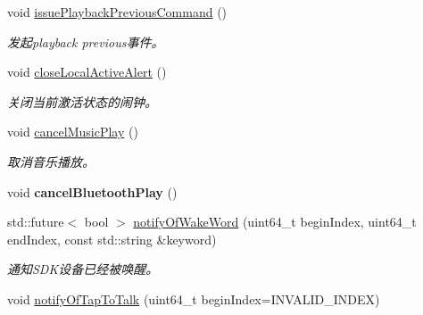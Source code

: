 \begin{DoxyCompactItemize}
\mbox{\label{classduerOSDcsSDK_1_1sdkInterfaces_1_1DcsSdk_ad9b5205e34f0671f00b5f50f197eec5a}} 
void \hyperlink{classduerOSDcsSDK_1_1sdkInterfaces_1_1DcsSdk_ad9b5205e34f0671f00b5f50f197eec5a}{issue\+Playback\+Previous\+Command} ()
\begin{DoxyCompactList}\small\item\em 发起playback previous事件。 \end{DoxyCompactList}\item 
\mbox{\label{classduerOSDcsSDK_1_1sdkInterfaces_1_1DcsSdk_aa36d3354168987e236a4c3afc8188ece}} 
void \hyperlink{classduerOSDcsSDK_1_1sdkInterfaces_1_1DcsSdk_aa36d3354168987e236a4c3afc8188ece}{close\+Local\+Active\+Alert} ()
\begin{DoxyCompactList}\small\item\em 关闭当前激活状态的闹钟。 \end{DoxyCompactList}\item 
\mbox{\label{classduerOSDcsSDK_1_1sdkInterfaces_1_1DcsSdk_ad598a5ca44f3d36851408b37ae1272ef}} 
void \hyperlink{classduerOSDcsSDK_1_1sdkInterfaces_1_1DcsSdk_ad598a5ca44f3d36851408b37ae1272ef}{cancel\+Music\+Play} ()
\begin{DoxyCompactList}\small\item\em 取消音乐播放。 \end{DoxyCompactList}\item 
\mbox{\label{classduerOSDcsSDK_1_1sdkInterfaces_1_1DcsSdk_a33672ba32700246c037d793aa4db47c1}} 
void {\bfseries cancel\+Bluetooth\+Play} ()
\item 
std\+::future$<$ bool $>$ \hyperlink{classduerOSDcsSDK_1_1sdkInterfaces_1_1DcsSdk_ab5fc27d96faecbf05ca7942d13c3edde}{notify\+Of\+Wake\+Word} (uint64\+\_\+t begin\+Index, uint64\+\_\+t end\+Index, const std\+::string \&keyword)
\begin{DoxyCompactList}\small\item\em 通知\+S\+D\+K设备已经被唤醒。 \end{DoxyCompactList}\item 
void \hyperlink{classduerOSDcsSDK_1_1sdkInterfaces_1_1DcsSdk_aeee4eeaa19b3b1d949688ee398aa9115}{notify\+Of\+Tap\+To\+Talk} (uint64\+\_\+t begin\+Index=I\+N\+V\+A\+L\+I\+D\+\_\+\+I\+N\+D\+EX)

\end{DoxyCompactItemize}
